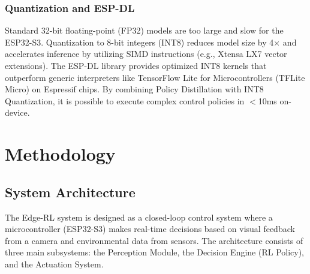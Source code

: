 \documentclass[conference]{IEEEtran}
\begin{document}
\subsubsection{Quantization and ESP-DL}
Standard 32-bit floating-point (FP32) models are too large and slow for the ESP32-S3. Quantization to 8-bit integers (INT8) reduces model size by 4$\times$ and accelerates inference by utilizing SIMD instructions (e.g., Xtensa LX7 vector extensions). The ESP-DL library \cite{espdl2024} provides optimized INT8 kernels that outperform generic interpreters like TensorFlow Lite for Microcontrollers (TFLite Micro) on Espressif chips. By combining Policy Distillation with INT8 Quantization, it is possible to execute complex control policies in $<$10ms on-device.

\FloatBarrier
\section{Methodology}
\label{sec:methodology}

\subsection{System Architecture}
The Edge-RL system is designed as a closed-loop control system where a microcontroller (ESP32-S3) makes real-time decisions based on visual feedback from a camera and environmental data from sensors. The architecture consists of three main subsystems: the Perception Module, the Decision Engine (RL Policy), and the Actuation System.
\end{document}
